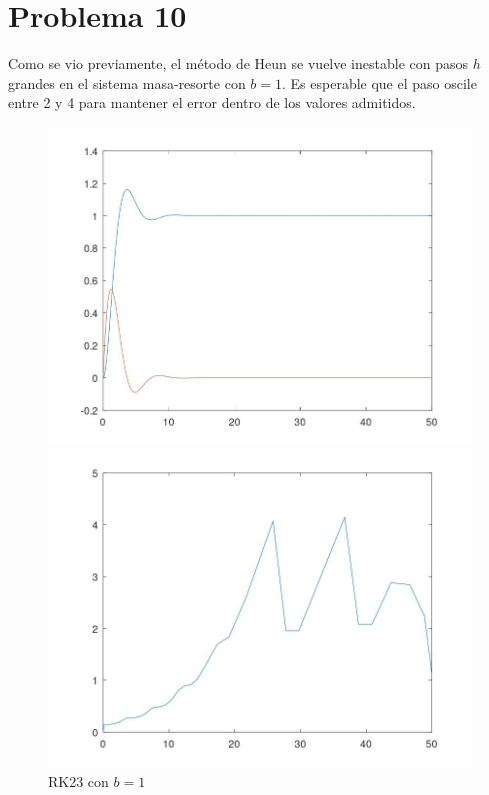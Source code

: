 \documentclass[a4paper,12pt]{article}
\begin{document}
\section*{Problema 10}

Como se vio previamente, el método de Heun se vuelve inestable con pasos \( h \) grandes en el sistema masa-resorte con \( b = 1 \). Es esperable que el paso oscile entre 2 y 4 para mantener el error dentro de los valores admitidos.


\begin{figure}[H]
\centering
\begin{minipage}[b]{0.49\textwidth}
    \centering
    \includegraphics[width=\textwidth]{img/ej10_1.jpeg}
\end{minipage}
\hfill
\begin{minipage}[b]{0.49\textwidth}
    \centering
    \includegraphics[width=\textwidth]{img/ej10_2.jpeg}
\end{minipage}
\caption{RK23 con \( b = 1 \)}
\end{figure}
\end{document}
